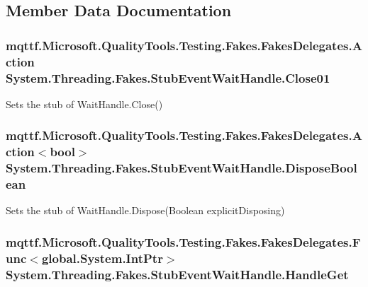 \subsection{Member Data Documentation}
\hypertarget{class_system_1_1_threading_1_1_fakes_1_1_stub_event_wait_handle_a396fefee6d119e2c15ef5172b7c0a720}{
\subsubsection[{Close01}]{\setlength{\rightskip}{0pt plus 5cm}mqttf.\-Microsoft.\-Quality\-Tools.\-Testing.\-Fakes.\-Fakes\-Delegates.\-Action System.\-Threading.\-Fakes.\-Stub\-Event\-Wait\-Handle.\-Close01}}\label{class_system_1_1_threading_1_1_fakes_1_1_stub_event_wait_handle_a396fefee6d119e2c15ef5172b7c0a720}


Sets the stub of Wait\-Handle.\-Close()

\hypertarget{class_system_1_1_threading_1_1_fakes_1_1_stub_event_wait_handle_ac50e7ecfc3d86f939b2eac43b55fc3eb}{
\subsubsection[{Dispose\-Boolean}]{\setlength{\rightskip}{0pt plus 5cm}mqttf.\-Microsoft.\-Quality\-Tools.\-Testing.\-Fakes.\-Fakes\-Delegates.\-Action$<$bool$>$ System.\-Threading.\-Fakes.\-Stub\-Event\-Wait\-Handle.\-Dispose\-Boolean}}\label{class_system_1_1_threading_1_1_fakes_1_1_stub_event_wait_handle_ac50e7ecfc3d86f939b2eac43b55fc3eb}


Sets the stub of Wait\-Handle.\-Dispose(\-Boolean explicit\-Disposing)

\hypertarget{class_system_1_1_threading_1_1_fakes_1_1_stub_event_wait_handle_a0d08681fa55764301d137acc04c22440}{
\subsubsection[{Handle\-Get}]{\setlength{\rightskip}{0pt plus 5cm}mqttf.\-Microsoft.\-Quality\-Tools.\-Testing.\-Fakes.\-Fakes\-Delegates.\-Func$<$global.\-System.\-Int\-Ptr$>$ System.\-Threading.\-Fakes.\-Stub\-Event\-Wait\-Handle.\-Handle\-Get}}\label{class_system_1_1_threading_1_1_fakes_1_1_stub_event_wait_handle_a0d08681fa55764301d137acc04c22440}


